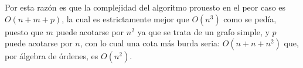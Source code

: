 Por esta razón es que la complejidad del algoritmo prouesto en el peor caso es $O(n+m+p)$, la cual es estrictamente mejor que $O(n^3)$ como se pedía, puesto que $m$ puede acotarse por $n^2$ ya que se trata de un grafo simple, y $p$ puede acotarse por $n$, con lo cual una cota más burda seria: $O(n+n+n^2)$ que, por álgebra de órdenes, es $O(n^2)$. \\
